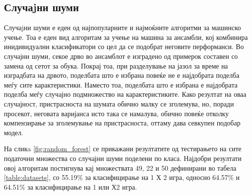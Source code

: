 \subsection{Случаjни шуми}
Случаjни шуми \cite{breiman2001random} е еден од најпопуларните и најмоќните алгоритми за машинско учење. Тоа е еден вид алгоритам за учење на машина за ансамбли, кој комбинира инидивидуални класификатори со цел да се подобрат неговите перформанси.
Во случајни шуми, секое дрво во ансамблот е изградено од примерок составен со замена од сетот за обука. Покрај тоа, при разделување на јазол за време на изградбата на дрвото, поделбата што е избрана повеќе не е најдобрата поделба меѓу сите карактеристики. Наместо тоа, поделбата што е избрана е најдобрата поделба меѓу случајно подмножество на карактеристиките. Како резултат на оваа случајност, пристрасноста на шумата обично малку се зголемува, но, поради просекот, неговата варијанса исто така се намалува, обично повеќе отколку компензирање за зголемување на пристрасноста, оттаму дава севкупен подобар модел.

На сликa \ref{fig:random_forest} се прикажани резултатите од тестирањето на сите податочни множества со случајни шуми поделени по класа. Најдобри резултати овој алгоритам постигнува кај множествата 49, 22 и 50 дефинирани во табела \ref{table:datasets}, со 55.19\% за класифицирање на 1 Х 2 игра, односно 64.57\% и 64.51\% за класифицирање на 1 или Х2 игра.

